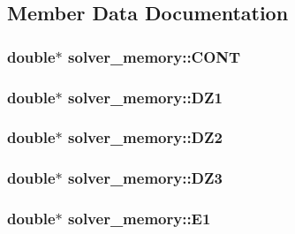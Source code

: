\subsection{Member Data Documentation}
\subsubsection[{\texorpdfstring{C\+O\+NT}{CONT}}]{\setlength{\rightskip}{0pt plus 5cm}double$\ast$ solver\+\_\+memory\+::\+C\+O\+NT}\hypertarget{structsolver__memory_a6e5e4e493505010035b690ea30d49242}{}\label{structsolver__memory_a6e5e4e493505010035b690ea30d49242}
\subsubsection[{\texorpdfstring{D\+Z1}{DZ1}}]{\setlength{\rightskip}{0pt plus 5cm}double$\ast$ solver\+\_\+memory\+::\+D\+Z1}\hypertarget{structsolver__memory_a298b97442915b9fd35c634ea519cb07c}{}\label{structsolver__memory_a298b97442915b9fd35c634ea519cb07c}
\subsubsection[{\texorpdfstring{D\+Z2}{DZ2}}]{\setlength{\rightskip}{0pt plus 5cm}double$\ast$ solver\+\_\+memory\+::\+D\+Z2}\hypertarget{structsolver__memory_aa5d1338448423480b4074926794433f9}{}\label{structsolver__memory_aa5d1338448423480b4074926794433f9}
\subsubsection[{\texorpdfstring{D\+Z3}{DZ3}}]{\setlength{\rightskip}{0pt plus 5cm}double$\ast$ solver\+\_\+memory\+::\+D\+Z3}\hypertarget{structsolver__memory_ab2a8855e36cb6a07cf023f0202fb52ef}{}\label{structsolver__memory_ab2a8855e36cb6a07cf023f0202fb52ef}
\subsubsection[{\texorpdfstring{E1}{E1}}]{\setlength{\rightskip}{0pt plus 5cm}double$\ast$ solver\+\_\+memory\+::\+E1}\hypertarget{structsolver__memory_a7824c82c506777035a208d517b3cfbd4}{}\label{structsolver__memory_a7824c82c506777035a208d517b3cfbd4}
